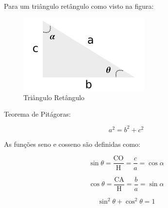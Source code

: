 Para um triângulo retângulo como visto na figura:

\begin{figure}[htbp]
\centering
\includegraphics{img/triangulo-retangulo.jpg}
\caption{Triângulo Retângulo}
\end{figure}

Teorema de Pitágoras:

\[
a^2 = b^2 + c^2
\]

As funções seno e cosseno são definidas como:

\[
\sin \theta = \frac{\text{CO}}{\text{H}} = \frac{c}{a} = \cos \alpha
\]

\[
\cos \theta = \frac{\text{CA}}{\text{H}} = \frac{b}{a} = \sin \alpha
\]

\[
\sin^2 \theta + \cos^2 \theta = 1
\]
